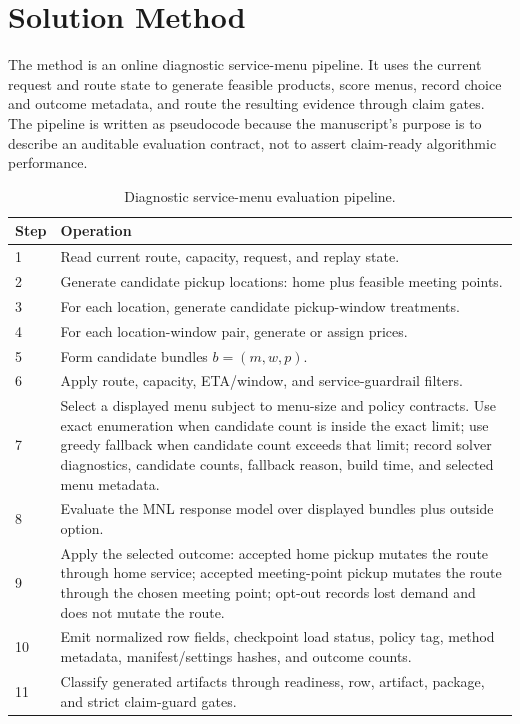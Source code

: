 \documentclass[a4paper,fleqn,review]{cas-dc}
\begin{document}
\section{Solution Method}

The method is an online diagnostic service-menu pipeline. It uses the current
request and route state to generate feasible products, score menus, record
choice and outcome metadata, and route the resulting evidence through claim
gates. The pipeline is written as pseudocode because the manuscript's purpose
is to describe an auditable evaluation contract, not to assert claim-ready
algorithmic performance.

\begin{table}[t]
\centering
\caption{Diagnostic service-menu evaluation pipeline.}
\begin{tabular}{@{}p{}p{}@{}}
\toprule
Step & Operation \\
\midrule
1 & Read current route, capacity, request, and replay state. \\
2 & Generate candidate pickup locations: home plus feasible meeting points. \\
3 & For each location, generate candidate pickup-window treatments. \\
4 & For each location-window pair, generate or assign prices. \\
5 & Form candidate bundles $b=(m,w,p)$. \\
6 & Apply route, capacity, ETA/window, and service-guardrail filters. \\
7 & Select a displayed menu subject to menu-size and policy contracts. Use exact enumeration when candidate count is inside the exact limit; use greedy fallback when candidate count exceeds that limit; record solver diagnostics, candidate counts, fallback reason, build time, and selected menu metadata. \\
8 & Evaluate the MNL response model over displayed bundles plus outside option. \\
9 & Apply the selected outcome: accepted home pickup mutates the route through home service; accepted meeting-point pickup mutates the route through the chosen meeting point; opt-out records lost demand and does not mutate the route. \\
10 & Emit normalized row fields, checkpoint load status, policy tag, method metadata, manifest/settings hashes, and outcome counts. \\
11 & Classify generated artifacts through readiness, row, artifact, package, and strict claim-guard gates. \\
\bottomrule
\end{tabular}
\end{table}
\end{document}
